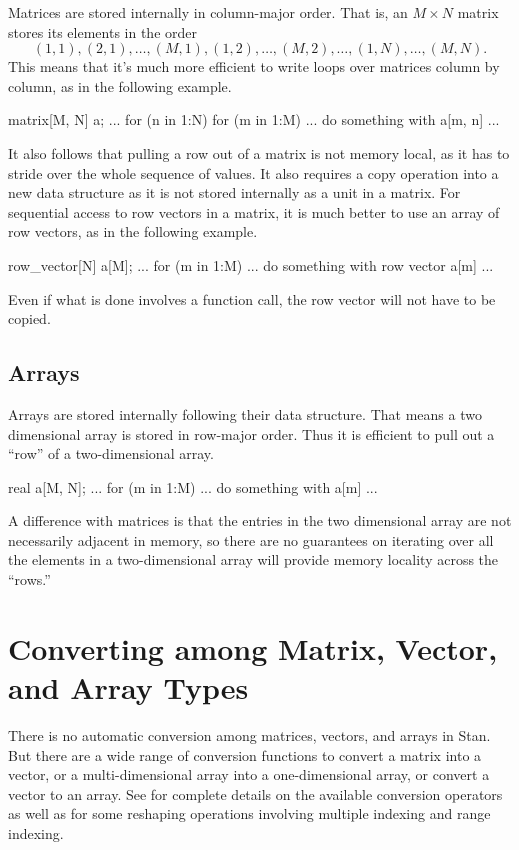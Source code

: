 Matrices are stored internally in column-major order.  That is, an $M
\times N$ matrix stores its elements in the order
\[
(1,1), (2, 1), \ldots, (M, 1), (1, 2), \ldots, (M, 2), \ldots, (1, N),
\ldots, (M, N).
\]
%
This means that it's much more efficient to write loops over matrices
column by column, as in the following example.
%
\begin{stancode}
matrix[M, N] a;
...
for (n in 1:N)
  for (m in 1:M)
     ... do something with a[m, n] ...
\end{stancode}

It also follows that pulling a row out of a matrix is not memory
local, as it has to stride over the whole sequence of values.  It also
requires a copy operation into a new data structure as it is not
stored internally as a unit in a matrix.  For sequential access to row
vectors in a matrix, it is much better to use an array of row vectors,
as in the following example.
%
\begin{stancode}
row_vector[N] a[M];
...
for (m in 1:M)
  ... do something with row vector a[m] ...
\end{stancode}
%
Even if what is done involves a function call, the row vector
 will not have to be copied.

\subsection{Arrays}

Arrays are stored internally following their data structure.  That
means a two dimensional array is stored in row-major order.  Thus it
is efficient to pull out a ``row'' of a two-dimensional array.
%
\begin{stancode}
real a[M, N];
...
for (m in 1:M)
  ... do something with a[m] ...
\end{stancode}

A difference with matrices is that the entries  in the two
dimensional array are not necessarily adjacent in memory, so there are
no guarantees on iterating over all the elements in a two-dimensional
array will provide memory locality across the ``rows.''

\section{Converting among Matrix, Vector, and Array Types}

There is no automatic conversion among matrices, vectors, and arrays
in Stan.  But there are a wide range of conversion functions to
convert a matrix into a vector, or a multi-dimensional array into a
one-dimensional array, or convert a vector to an array.  See
 for complete details on the available conversion
operators as well as  for some
reshaping operations involving multiple indexing and range indexing.


